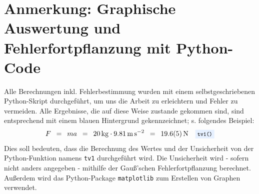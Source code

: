\documentclass{article}
\newcommand{\widespace}{\enspace}
\newcommand{\wideeq}{\widespace = \widespace}
\newcommand{\coderef}[1]{%
    \text{\footnotesize \colorbox{codebg}{\texttt{#1()}}}%
}
\begin{document}
\newpage

\section{Anmerkung: Graphische Auswertung und Fehlerfortpflanzung mit Python-Code}

Alle Berechnungen inkl. Fehlerbestimmung wurden mit einem selbstgeschriebenen
Python-Skript durchgeführt, um uns die Arbeit zu erleichtern und Fehler zu
vermeiden. Alle Ergebnisse, die auf diese Weise zustande gekommen sind,
sind entsprechend mit einem \colorbox{codebg}{blauen Hintergrund} gekennzeichnet;
s. folgendes Beispiel:
\[
    F \wideeq ma \wideeq \qty{20}{\kg} \cdot \qty{9.81}{\meter\per\square\second}
    \wideeq \qty{19.6 \pm 0.5}{\newton} \quad \coderef{tv1}
\]
Dies soll bedeuten, dass die Berechnung des Wertes und der Unsicherheit von der
Python-Funktion namens \verb|tv1| durchgeführt wird.
Die Unsicherheit wird - sofern nicht anders angegeben - mithilfe der Gauß'schen
Fehlerfortpflanzung berechnet.
Außerdem wird das Python-Package \texttt{matplotlib} zum Erstellen
von Graphen verwendet.
\end{document}
